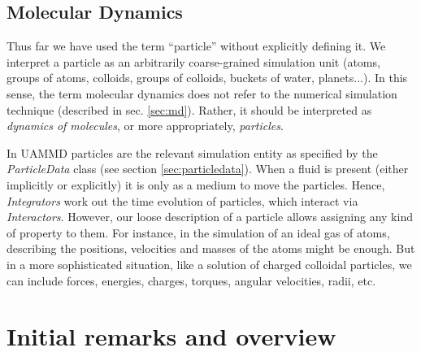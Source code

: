 \documentclass[ twoside,openright,titlepage,numbers=noenddot,%
headinclude,footinclude,cleardoublepage=empty,abstract=on,
BCOR=5mm,paper=b5,fontsize=11pt, dvipsnames
]{scrreprt}
\newcommand{\uammd}{\gls{UAMMD}\xspace}
\begin{document}
\section{\uppercase{{\bfseries M}}olecular \uppercase{\textbf{D}}ynamics}\label{sec:dynmol}
Thus far we have used the term ``particle'' without explicitly defining it. We interpret a particle as an arbitrarily coarse-grained simulation unit (atoms, groups of atoms, colloids, groups of colloids, buckets of water, planets...). In this sense, the term molecular dynamics does not refer to the numerical simulation technique (described in sec. \ref{sec:md}). Rather, it should be interpreted as \emph{dynamics of molecules}, or more appropriately, \emph{particles}.

In \uammd particles are the relevant simulation entity as specified by the \emph{ParticleData} class (see section \ref{sec:particledata}). When a fluid is present (either implicitly or explicitly) it is only as a medium to move the particles. Hence, \emph{Integrators} work out the time evolution of particles, which interact via \emph{Interactors}. However, our loose description of a particle allows assigning any kind of property to them. For instance, in the simulation of an ideal gas of atoms, describing the positions, velocities and masses of the atoms might be enough. But in a more sophisticated situation, like a solution of charged colloidal particles, we can include forces, energies, charges, torques, angular velocities, radii, etc.



\chapter{Initial remarks and overview}
\end{document}
